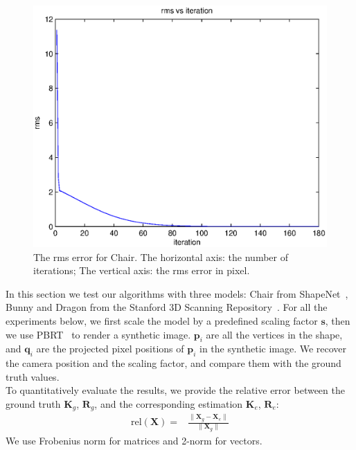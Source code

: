 \documentclass[10pt,twocolumn,letterpaper]{article}
\begin{document}
\begin{figure}
\begin{center}
	\includegraphics[scale=0.5]{chair-figure.eps}
\end{center}
	\caption{The rms error for Chair. The horizontal axis: the number of iterations; The vertical axis: the rms error in pixel.}
\label{fig:chairplot}
\end{figure}

\noindent
In this section we test our algorithms with three models: Chair from ShapeNet~\cite{shapenet2015}, Bunny and Dragon from the Stanford 3D Scanning Repository~\cite{stanford3d2014}. For all the experiments below, we first scale the model by a predefined scaling factor $\mathbf{s}$, then we use PBRT~\cite{pharr2010pbrt} to render a synthetic image. $\mathbf{p}_i$ are all the vertices in the shape, and $\mathbf{q}_i$ are the projected pixel positions of $\mathbf{p}_i$ in the synthetic image. We recover the camera position and the scaling factor, and compare them with the ground truth values.\\

\noindent
To quantitatively evaluate the results, we provide the relative error between the ground truth $\mathbf{K}_g$, $\mathbf{R}_g$, and the corresponding estimation $\mathbf{K}_e$, $\mathbf{R}_e$:
\begin{equation}
\begin{split}
\textrm{rel}(\mathbf{X})=&\frac{\|\mathbf{X}_g-\mathbf{X}_e\|}{\|\mathbf{X}_g\|}
\end{split}
\end{equation}
We use Frobenius norm for matrices and 2-norm for vectors.\\
\end{document}
